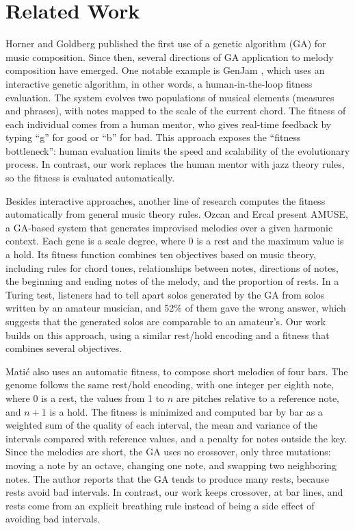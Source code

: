 \section{Related Work}\label{sec:related}

Horner and Goldberg \cite{horner1991} published the first use of a genetic algorithm (GA) for music composition. Since then, several directions of GA application to melody composition have emerged. One notable example is GenJam \cite{biles1997}, which uses an interactive genetic algorithm, in other words, a human-in-the-loop fitness evaluation. The system evolves two populations of musical elements (measures and phrases), with notes mapped to the scale of the current chord. The fitness of each individual comes from a human mentor, who gives real-time feedback by typing ``g'' for good or ``b'' for bad. This approach exposes the ``fitness bottleneck'': human evaluation limits the speed and scalability of the evolutionary process. In contrast, our work replaces the human mentor with jazz theory rules, so the fitness is evaluated automatically.

Besides interactive approaches, another line of research computes the fitness automatically from general music theory rules. Ozcan and Ercal \cite{ozcan2008} present AMUSE, a GA-based system that generates improvised melodies over a given harmonic context. Each gene is a scale degree, where 0 is a rest and the maximum value is a hold. Its fitness function combines ten objectives based on music theory, including rules for chord tones, relationships between notes, directions of notes, the beginning and ending notes of the melody, and the proportion of rests. In a Turing test, listeners had to tell apart solos generated by the GA from solos written by an amateur musician, and 52\% of them gave the wrong answer, which suggests that the generated solos are comparable to an amateur's. Our work builds on this approach, using a similar rest/hold encoding and a fitness that combines several objectives.

Mati\'c \cite{matic2010} also uses an automatic fitness, to compose short melodies of four bars. The genome follows the same rest/hold encoding, with one integer per eighth note, where 0 is a rest, the values from 1 to $n$ are pitches relative to a reference note, and $n+1$ is a hold. The fitness is minimized and computed bar by bar as a weighted sum of the quality of each interval, the mean and variance of the intervals compared with reference values, and a penalty for notes outside the key. Since the melodies are short, the GA uses no crossover, only three mutations: moving a note by an octave, changing one note, and swapping two neighboring notes. The author reports that the GA tends to produce many rests, because rests avoid bad intervals. In contrast, our work keeps crossover, at bar lines, and rests come from an explicit breathing rule instead of being a side effect of avoiding bad intervals.

